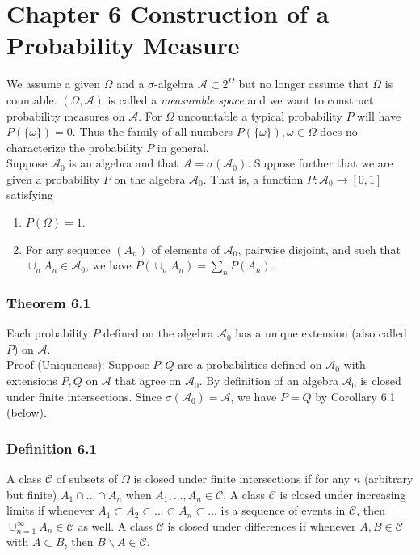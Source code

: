 \documentclass{article}
\begin{document}
{\newpage
\section*{Chapter 6 Construction of a Probability Measure}

We assume a given $\Omega$ and a $\sigma$-algebra $\mathcal{A} \subset 2^\Omega$ but no longer assume that $\Omega$ is countable. $(\Omega, \mathcal{A})$ is called a \textit{measurable space} and we want to construct probability measures on $\mathcal{A}$. For $\Omega$ uncountable a typical probability $P$ will have $P(\{\omega\}) = 0$. Thus the family of all numbers $P(\{\omega\}), \omega \in \Omega$ does no characterize the probability $P$ in general. \\

Suppose $\mathcal{A}_0$ is an algebra and that $\mathcal{A} = \sigma(\mathcal{A}_0)$. Suppose further that we are given a probability $P$ on the algebra $\mathcal{A}_0$. That is, a function $P: \mathcal{A}_0 \rightarrow [0,1]$ satisfying

\begin{enumerate}
\item $P(\Omega) = 1$.

\item For any sequence $(A_n)$ of elements of $\mathcal{A}_0$, pairwise disjoint, and such that $\cup_n A_n \in \mathcal{A}_0$, we have $P\left(\cup_n A_n\right) = \sum_n P(A_n)$. 
\end{enumerate}

\subsubsection*{Theorem 6.1}

Each probability $P$ defined on the algebra $\mathcal{A}_0$ has a unique extension (also called $P$) on $\mathcal{A}$. \\

Proof (Uniqueness): Suppose $P,Q$ are a probabilities defined on $\mathcal{A}_0$ with extensions $P,Q$ on $\mathcal{A}$ that agree on $\mathcal{A}_0$. By definition of an algebra $\mathcal{A}_0$ is closed under finite intersections. Since $\sigma(\mathcal{A}_0) = \mathcal{A}$, we have $P = Q$ by Corollary 6.1 (below).

\subsubsection*{Definition 6.1} 

A class $\mathcal{C}$ of subsets of $\Omega$ is closed under finite intersections if for any $n$ (arbitrary but finite) $A_1 \cap \dots \cap A_n$ when $A_1, \dots, A_n \in \mathcal{C}$. A class $\mathcal{C}$ is closed under increasing limits if whenever $A_1 \subset A_2 \subset \dots \subset A_n \subset \dots$ is a sequence of events in $\mathcal{C}$, then $\cup_{n=1}^\infty A_n \in \mathcal{C}$ as well. A class $\mathcal{C}$ is closed under differences if whenever $A,B \in \mathcal{C}$ with $A \subset B$, then $B \backslash A \in \mathcal{C}$. 

}
\end{document}
